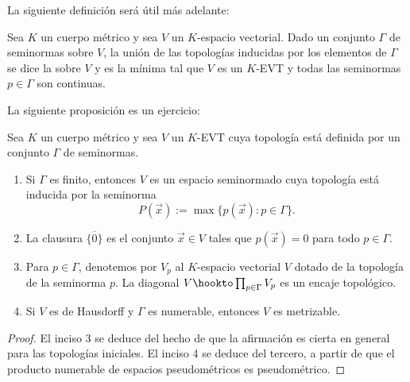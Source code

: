 \documentclass[topologia-analisis.tex]{subfiles}
\begin{document}
La siguiente definición será útil más adelante:
\begin{mydef}
	Sea $K$ un cuerpo métrico y sea $V$ un $K$-espacio vectorial.
	Dado un conjunto $\Gamma$ de seminormas sobre $V$, la unión de las topologías inducidas por los elementos de $\Gamma$
	se dice la  sobre $V$ y es la mínima tal que $V$ es un $K$-EVT y todas las seminormas $p \in \Gamma$
	son continuas.
\end{mydef}
La siguiente proposición es un ejercicio:
\begin{prop}\label{thm:top_def_seminorm_set}
	Sea $K$ un cuerpo métrico y sea $V$ un $K$-EVT cuya topología está definida por un conjunto $\Gamma$ de seminormas.
	\begin{enumerate}
		\item Si $\Gamma$ es finito, entonces $V$ es un espacio seminormado cuya topología está inducida por la seminorma
			\[
				P(\vec x) := \max\{ p(\vec x) : p \in \Gamma \}.
			\]
		\item La clausura $\overline{\{ 0 \}}$ es el conjunto $\vec x \in V$ tales que $p(\vec x) = 0$ para todo $p \in \Gamma$.
		\item Para $p \in \Gamma$, denotemos por $V_p$ al $K$-espacio vectorial $V$ dotado de la topología de la seminorma $p$.
			La diagonal $V \hookto \prod_{p\in \Gamma} V_p$ es un encaje topológico.
		\item Si $V$ es de Hausdorff y $\Gamma$ es numerable, entonces $V$ es metrizable.
	\end{enumerate}
\end{prop}
\begin{proof}
	El inciso 3 se deduce del hecho de que la afirmación es cierta en general para las topologías iniciales.
	El inciso 4 se deduce del tercero, a partir de que el producto numerable de espacios pseudométricos es pseudométrico.
\end{proof}

\end{document}
